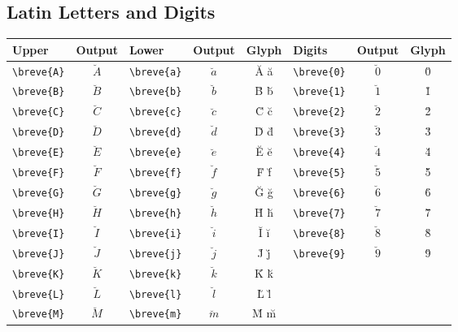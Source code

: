 \documentclass[12pt,a4paper]{article}
\begin{document}
\subsection*{Latin Letters and Digits}
\begin{longtable}{|l|c|l|c|c|l|c|c|}
\hline
\textbf{Upper}   & \textbf{Output} & \textbf{Lower}   & \textbf{Output} & \textbf{Glyph} & \textbf{Digits}  & \textbf{Output} & \textbf{Glyph} \\
\hline
\verb|\breve{A}| & $\breve{A}$     & \verb|\breve{a}| & $\breve{a}$     & Ă ă            & \verb|\breve{0}| & $\breve{0}$     & 0̆ \\
\verb|\breve{B}| & $\breve{B}$     & \verb|\breve{b}| & $\breve{b}$     & B̆ b̆            & \verb|\breve{1}| & $\breve{1}$     & 1̆ \\
\verb|\breve{C}| & $\breve{C}$     & \verb|\breve{c}| & $\breve{c}$     & C̆ c̆            & \verb|\breve{2}| & $\breve{2}$     & 2̆ \\
\verb|\breve{D}| & $\breve{D}$     & \verb|\breve{d}| & $\breve{d}$     & D̆ d̆            & \verb|\breve{3}| & $\breve{3}$     & 3̆ \\
\verb|\breve{E}| & $\breve{E}$     & \verb|\breve{e}| & $\breve{e}$     & Ĕ ĕ            & \verb|\breve{4}| & $\breve{4}$     & 4̆ \\
\verb|\breve{F}| & $\breve{F}$     & \verb|\breve{f}| & $\breve{f}$     & F̆ f̆            & \verb|\breve{5}| & $\breve{5}$     & 5̆ \\
\verb|\breve{G}| & $\breve{G}$     & \verb|\breve{g}| & $\breve{g}$     & Ğ ğ            & \verb|\breve{6}| & $\breve{6}$     & 6̆ \\
\verb|\breve{H}| & $\breve{H}$     & \verb|\breve{h}| & $\breve{h}$     & H̆ h̆            & \verb|\breve{7}| & $\breve{7}$     & 7̆ \\
\verb|\breve{I}| & $\breve{I}$     & \verb|\breve{i}| & $\breve{i}$     & Ĭ ĭ            & \verb|\breve{8}| & $\breve{8}$     & 8̆ \\
\verb|\breve{J}| & $\breve{J}$     & \verb|\breve{j}| & $\breve{j}$     & J̆ j̆            & \verb|\breve{9}| & $\breve{9}$     & 9̆ \\
\verb|\breve{K}| & $\breve{K}$     & \verb|\breve{k}| & $\breve{k}$     & K̆ k̆            &                  &                 & \\
\verb|\breve{L}| & $\breve{L}$     & \verb|\breve{l}| & $\breve{l}$     & L̆ l̆            &                  &                 & \\
\verb|\breve{M}| & $\breve{M}$     & \verb|\breve{m}| & $\breve{m}$     & M̆ m̆            &                  &                 & \\

\end{longtable}
\end{document}

